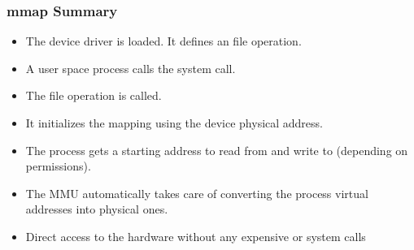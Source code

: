 \begin{frame}
  \frametitle{mmap Summary}
  \begin{itemize}
  \item The device driver is loaded. It defines an  file
    operation.
  \item A user space process calls the  system call.
  \item The  file operation is called.
  \item It initializes the mapping using the device physical address.
  \item The process gets a starting address to read from and write to
    (depending on permissions).
  \item The MMU automatically takes care of converting the process
    virtual addresses into physical ones.
  \item Direct access to the hardware without any expensive
     or  system calls
  \end{itemize}
\end{frame}

